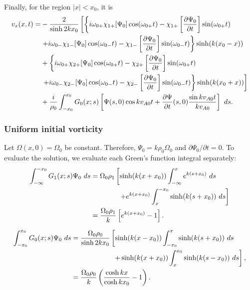 \documentclass[12pt]{../style-files/ociamthesis}
\begin{document}
Finally, for the region $|x|<x_0$, it is
\begin{align}
v_x(x, t) =& -\frac{2}{\sinh{2kx_0}} \left[ \left\{ i\omega_{0+}\chi_{1+}[\Psi_0] \cos(\omega_{0+} t) - \chi_{1+}\left[ \frac{\partial \Psi_0}{\partial t} \right] \sin(\omega_{0+} t) \right. \right. \notag \\
& \left. + i\omega_{0-}\chi_{1-}[\Psi_0] \cos(\omega_{0-} t) - \chi_{1-}\left[ \frac{\partial \Psi_0}{\partial t} \right] \sin(\omega_{0-} t) \right\} \sinh(k(x_0 - x)) \notag \\ 
& + \left\{ i\omega_{0+}\chi_{2+}[\Psi_0] \cos(\omega_{0+} t) - \chi_{2+}\left[ \frac{\partial \Psi_0}{\partial t} \right] \sin(\omega_{0+} t) \right. \notag \\
& \left. \left. + i\omega_{0-}\chi_{2-}[\Psi_0] \cos(\omega_{0-} t) - \chi_{2-}\left[ \frac{\partial \Psi_0}{\partial t} \right] \sin(\omega_{0-} t) \right\} \sinh(k(x_0 + x)) \right] \notag \\
& + \frac{i}{\rho_0} \int_{-x_0}^{x_0} G_0(x;s) \left[ \Psi(s, 0) \cos{kv_{A0}t} + \frac{\partial \Psi}{\partial t}(s, 0) \frac{\sin{kv_{A0}t}}{kv_{A0}} \right]~ds.
\end{align}


\subsubsection{Uniform initial vorticity}

Let $\Omega(x, 0) = \Omega_0$ be constant. Therefore, $\Psi_0 = k\rho_0\Omega_0$ and $\partial \Psi_0 / \partial t = 0$. To evaluate the solution, we evaluate each Green's function integral separately:
\begin{align}
\int_{-\infty}^{-x_0} G_1(x;s) \Psi_0 ~ds &= \Omega_0 \rho_1 \left[ \sinh(k(x+x_0)) \int_{-\infty}^{x} e^{k(s + x_0)} ~ds \right . \notag \\
&\qquad \qquad \left.+ e^{k(x+x_0)} \int_{x}^{-x_0} \sinh(k(s+x_0)) ~ds \right] \notag \\
&= \frac{\Omega_0 \rho_1}{k} \left[ e^{k(x+x_0)} - 1 \right].
\end{align}

\begin{align}
\int_{-x_0}^{x_0} G_0(x;s) \Psi_0 ~ds &= \frac{\Omega_0 \rho_0}{\sinh{2kx_0}} \left[ \sinh(k(x-x_0)) \int_{-x_0}^{x} \sinh(k(s+x_0)) ~ds \right. \notag \\
&\qquad \qquad \qquad \left. + \sinh(k(x+x_0)) \int_{x}^{x_0} \sinh(k(s-x_0)) ~ds \right], \notag \\
&= \frac{\Omega_0 \rho_0}{k} \left( \frac{\cosh{kx}}{\cosh{kx_0}} - 1 \right).
\end{align}
\end{document}
